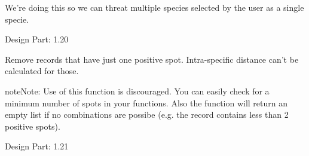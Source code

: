 \documentclass[letterpaper,10pt,english]{sphinxmanual}
\begin{document}
\begin{fulllineitems}
\begin{fulllineitems}
We're doing this so we can threat multiple species selected by
the user as a single specie.

Design Part: 1.20

\end{fulllineitems}


\begin{fulllineitems}
\label{setlyze/database:setlyze.database.AccessDBGeneric.remove_single_spot_plates}
Remove records that have just one positive spot. Intra-specific
distance can’t be calculated for those.

\begin{notice}{note}{Note:}
Use of this function is discouraged. You can easily check for
a minimum number of spots in your functions. Also the function
{\hyperref[setlyze/std:setlyze.std.get_spot_combinations_from_record]{}} will
return an empty list if no combinations are possibe (e.g. the
record contains less than 2 positive spots).
\end{notice}

Design Part: 1.21

\end{fulllineitems}


\end{fulllineitems}

\end{document}
